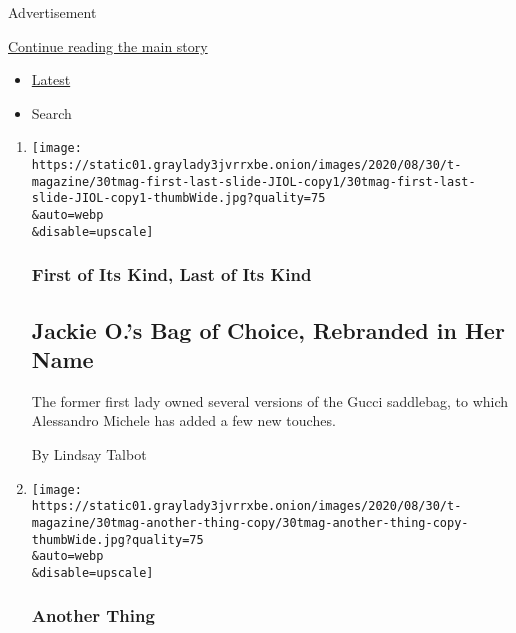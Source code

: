 Advertisement

\protect\hyperlink{after-mid1}{Continue reading the main story}

\begin{itemize}
\tightlist
\item
  \protect\hyperlink{stream-panel}{Latest}
\item
  Search
\end{itemize}

\begin{enumerate}
\def\labelenumi{\arabic{enumi}.}
\item
  \href{/2020/08/28/t-magazine/gucci-jackie-1961-saddlebag.html}{}

  \texttt{[image: https://static01.graylady3jvrrxbe.onion/images/2020/08/30/t-magazine/30tmag-first-last-slide-JIOL-copy1/30tmag-first-last-slide-JIOL-copy1-thumbWide.jpg?quality=75\\\&auto=webp\\\&disable=upscale]}

  \hypertarget{first-of-its-kind-last-of-its-kind}{%
  \subsubsection{First of Its Kind, Last of Its
  Kind}\label{first-of-its-kind-last-of-its-kind}}

  \hypertarget{jackie-os-bag-of-choice-rebranded-in-her-name}{%
  \subsection{Jackie O.'s Bag of Choice, Rebranded in Her
  Name}\label{jackie-os-bag-of-choice-rebranded-in-her-name}}

  The former first lady owned several versions of the Gucci saddlebag,
  to which Alessandro Michele has added a few new touches.

  By Lindsay Talbot
\item
  \href{/2020/08/28/t-magazine/bebitalia-camaleonda-sofa.html}{}

  \texttt{[image: https://static01.graylady3jvrrxbe.onion/images/2020/08/30/t-magazine/30tmag-another-thing-copy/30tmag-another-thing-copy-thumbWide.jpg?quality=75\\\&auto=webp\\\&disable=upscale]}

  \hypertarget{another-thing}{%
  \subsubsection{Another Thing}\label{another-thing}}

  \hypertarget{a-sculptural-sofa-rereleased-for-the-first-time}{%
}
\end{enumerate}
